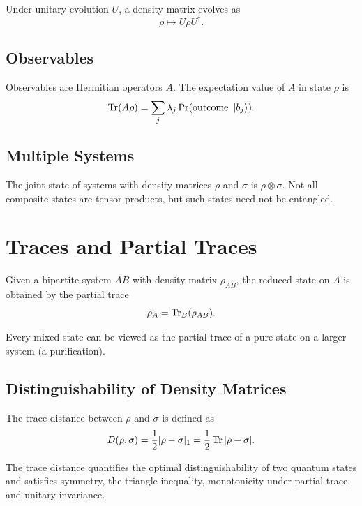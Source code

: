 Under unitary evolution $U$, a density matrix evolves as
\begin{equation}
  \rho \mapsto U \rho U^\dagger.
\end{equation}

\subsection{Observables}

Observables are Hermitian operators $A$. The expectation value of $A$ in state $\rho$ is
\begin{equation}
  \Tr(A\rho) = \sum_j \lambda_j \Pr(\text{outcome } \ket{b_j}).
\end{equation}

\subsection{Multiple Systems}

The joint state of systems with density matrices $\rho$ and $\sigma$ is $\rho \otimes \sigma$. Not all composite states are tensor products, but such states need not be entangled.

\section{Traces and Partial Traces}

Given a bipartite system $AB$ with density matrix $\rho_{AB}$, the reduced state on $A$ is obtained by the partial trace
\begin{equation}
  \rho_A = \Tr_B(\rho_{AB}).
\end{equation}

Every mixed state can be viewed as the partial trace of a pure state on a larger system (a purification).

\subsection{Distinguishability of Density Matrices}

The trace distance between $\rho$ and $\sigma$ is defined as
\begin{equation}
  D(\rho,\sigma) = \frac12 | \rho - \sigma |_1 = \frac12 \Tr |\rho-\sigma|.
\end{equation}

The trace distance quantifies the optimal distinguishability of two quantum states and satisfies symmetry, the triangle inequality, monotonicity under partial trace, and unitary invariance.




